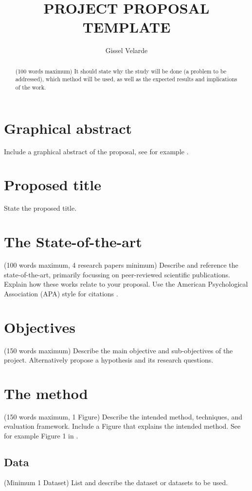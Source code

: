\documentclass[11pt,a4paper]{article}
\title{PROJECT PROPOSAL TEMPLATE}
\author{ Gissel Velarde }
\begin{document}
\maketitle	

 \tableofcontents
 \pagebreak
\begin{abstract}
(100 words maximum) It should state why the study will be done (a problem to be addressed), which method will be used, as well as the expected results and implications of the work.
\end{abstract}


\section{Graphical abstract}
Include a graphical abstract of the proposal, see for example . 

\section{Proposed title}
State the proposed title.

\section{The State-of-the-art}
(100 words maximum, 4 research papers minimum) Describe and reference the state-of-the-art, primarily focussing on peer-reviewed scientific publications. Explain how these works relate to your proposal. Use the American Psychological Association (APA) style for citations .

\section{Objectives}
(150 words maximum) Describe the main objective and sub-objectives of the project. Alternatively propose a hypothesis and its research questions. 

\section{The method}
(150 words maximum, 1 Figure) Describe the intended method, techniques, and evaluation framework. Include a Figure that explains the intended method. See for example Figure 1 in .

\subsection{Data}
(Minimum 1 Dataset) List and describe the dataset or datasets to be used.
\end{document}
